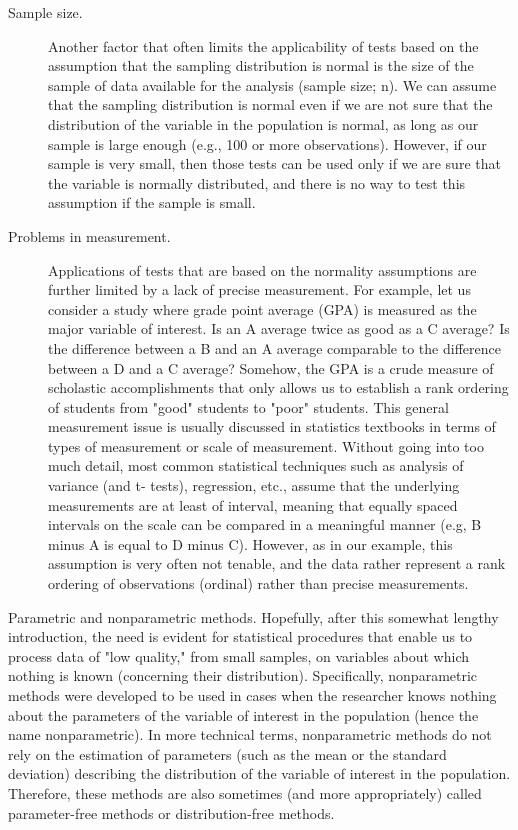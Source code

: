 \begin{description}
\item[Sample size.] Another factor that often limits the applicability of tests based on the assumption that the sampling distribution is normal is the size of the sample of data available for the analysis (sample size; n). We can assume that the sampling distribution is normal even if we are not sure that the distribution of the variable in the population is normal, as long as our sample is large enough (e.g., 100 or more observations). However, if our sample is very small, then those tests can be used only if we are sure that the variable is normally distributed, and there is no way to test this assumption if the sample is small.

\item[Problems in measurement.] Applications of tests that are based on the normality assumptions are further limited by a lack of precise measurement. For example, let us consider a study where grade point average (GPA) is measured as the major variable of interest. Is an A average twice as good as a C average? Is the difference between a B and an A average comparable to the difference between a D and a C average? Somehow, the GPA is a crude measure of scholastic accomplishments that only allows us to establish a rank ordering of students from "good" students to "poor" students. This general measurement issue is usually discussed in statistics textbooks in terms of types of measurement or scale of measurement. Without going into too much detail, most common statistical techniques such as analysis of variance (and t- tests), regression, etc., assume that the underlying measurements are at least of interval, meaning that equally spaced intervals on the scale can be compared in a meaningful manner (e.g, B minus A is equal to D minus C). However, as in our example, this assumption is very often not tenable, and the data rather represent a rank ordering of observations (ordinal) rather than precise measurements.
\end{description}
Parametric and nonparametric methods. Hopefully, after this somewhat lengthy introduction, the need is evident for statistical procedures that enable us to process data of "low quality," from small samples, on variables about which nothing is known (concerning their distribution). Specifically, nonparametric methods were developed to be used in cases when the researcher knows nothing about the parameters of the variable of interest in the population (hence the name nonparametric). In more technical terms, nonparametric methods do not rely on the estimation of parameters (such as the mean or the standard deviation) describing the distribution of the variable of interest in the population. Therefore, these methods are also sometimes (and more appropriately) called parameter-free methods or distribution-free methods.

